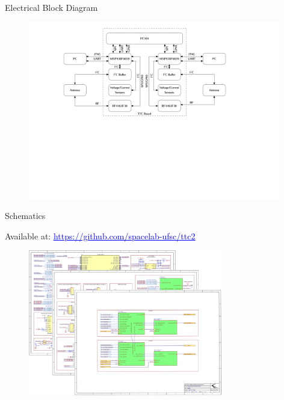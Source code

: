 \begin{frame}{Electrical Block Diagram}

    \begin{figure}[!ht]
        \begin{center}
            \includegraphics[width=11cm]{figures/hardware_diagram}
        \end{center}
    \end{figure}

\end{frame}

\begin{frame}{Schematics}

    Available at: \href{https://github.com/spacelab-ufsc/ttc2/tree/master/hardware/outputs/board_schematics}{\textcolor{blue}{\underline{https://github.com/spacelab-ufsc/ttc2}}}

    \begin{figure}[!ht]
        \begin{center}
            \includegraphics[width=8.5cm]{figures/ttc2-schematics.png}
        \end{center}
    \end{figure}

\end{frame}

